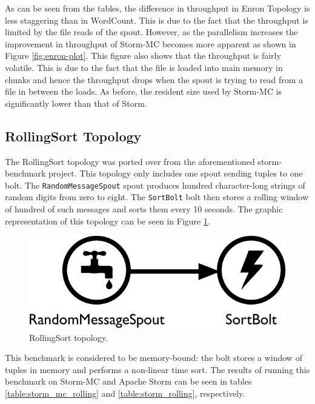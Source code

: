 \documentclass[bsc,logo,frontabs,twoside,singlespacing,normalheadings,parskip]{infthesis}\usepackage[]{graphicx}\usepackage[]{color}
\begin{document}
As can be seen from the tables, the difference in throughput in Enron Topology is less staggering than in WordCount. This is due to the fact that the throughput is limited by the file reads of the spout. However, as the parallelism increases the improvement in throughput of Storm-MC becomes more apparent as shown in Figure \ref{fig:enron-plot}. This figure also shows that the throughput is fairly volatile. This is due to the fact that the file is loaded into main memory in chunks and hence the throughput drops when the spout is trying to read from a file in between the loads. As before, the resident size used by Storm-MC is significantly lower than that of Storm.

\subsection{RollingSort Topology}

The RollingSort topology was ported over from the aforementioned storm-benchmark project. This topology only includes one spout sending tuples to one bolt. The \texttt{RandomMessageSpout} spout produces hundred character-long strings of random digits from zero to eight. The \texttt{SortBolt} bolt then stores a rolling window of hundred of such messages and sorts them every 10 seconds. The graphic representation of this topology can be seen in Figure \ref{fig:rolling_topology}.

\begin{figure}[!htb]
	\centering
	\includegraphics[scale=0.475]{pdf/rolling_topology.pdf}
	\caption{RollingSort topology.}
	\label{fig:rolling_topology}
\end{figure}

This benchmark is considered to be memory-bound: the bolt stores a window of tuples in memory and performs a non-linear time sort. The results of running this benchmark on Storm-MC and Apache Storm can be seen in tables \ref{table:storm_mc_rolling} and \ref{table:storm_rolling}, respectively.
\end{document}
